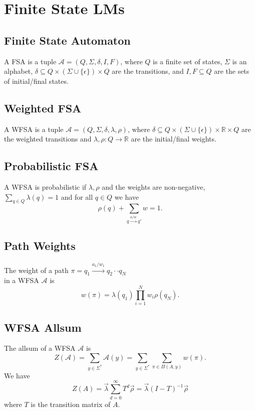 \section{Finite State LMs}
\subsection*{Finite State Automaton}
A {FSA} is a tuple $\mathcal{A}=(Q,\Sigma,\delta,I,F)$, where $Q$ is a finite set of states, $\Sigma$ is an alphabet, $\delta\subseteq Q\times(\Sigma\cup\{\epsilon\})\times Q$ are the transitions, and $I,F\subseteq Q$ are the sets of initial/final states.

\subsection*{Weighted FSA}
A {WFSA} is a tuple $\mathcal{A}=(Q,\Sigma,\delta,\lambda,\rho)$, where $\delta\subseteq Q\times(\Sigma\cup\{\epsilon\})\times\mathbb{R}\times Q$ are the weighted transitions and $\lambda,\rho:Q\rightarrow\mathbb{R}$ are the initial/final weights.

\subsection*{Probabilistic FSA}
A WFSA is probabilistic if $\lambda,\rho$ and the weights are non-negative, $\sum_{q\in Q}\lambda(q)=1$ and for all $q\in Q$ we have $$\rho(q)+\sum_{q\stackrel{a/w}{\longrightarrow}q'}w=1.$$

\subsection*{Path Weights}
The weight of a path $\pi=q_1\stackrel{a_1/w_1}{\longrightarrow}q_2\cdot\cdot q_N$\\ in a {WFSA} $\mathcal{A}$ is \\
$$\displaystyle w(\pi)=\lambda(q_1)\prod_{i=1}^{N}w_i\rho(q_N).$$

\subsection*{WFSA Allsum}
The allsum of a {WFSA} $\mathcal{A}$ is \\
$$\displaystyle {Z}(\mathcal{A})=\sum_{y\in\Sigma^*}\mathcal{A}(y)=\sum_{y\in\Sigma^*}\sum_{\pi\in\Pi(A,y)}w(\pi).$$
We have $$Z(A)=\vec{\lambda}\sum_{d=0}^\infty T^d\vec{\rho}=\vec{\lambda}(I-T)^{-1}\vec{\rho}$$ where $T$ is the transition matrix of $A$.

